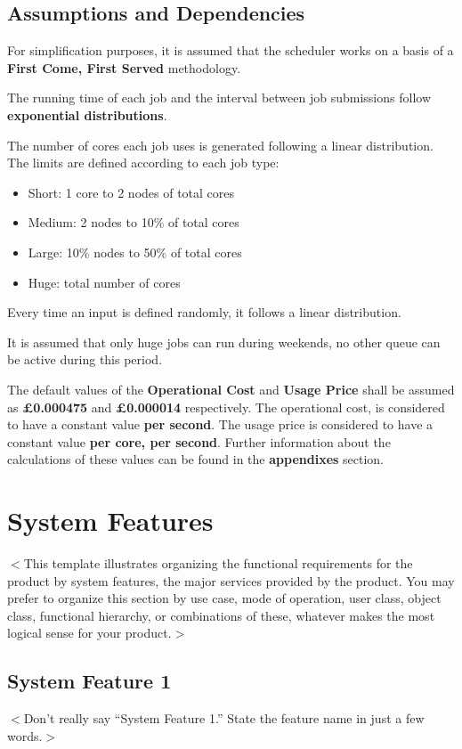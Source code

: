 \documentclass{scrreprt}
\begin{document}
\section{Assumptions and Dependencies}

\par For simplification purposes, it is assumed that the scheduler works on a basis of a \textbf{First Come, First Served} methodology. 
\par The running time of each job and the interval between job submissions follow \textbf{exponential distributions}.
\par The number of cores each job uses is generated following a linear distribution. The limits are defined according to each job type:
\begin{itemize}
\item Short: 1 core to 2 nodes of total cores
\item Medium: 2 nodes to 10\% of total cores
\item Large: 10\% nodes to 50\% of total cores
\item Huge: total number of cores
\end{itemize}
\par Every time an input is defined randomly, it follows a linear distribution.
\par It is assumed that only huge jobs can run during weekends, no other queue can be active during this period.
\par The default values of the \textbf{Operational Cost} and \textbf{Usage Price} shall be assumed as \textbf{£0.000475} and \textbf{£0.000014} respectively. The operational cost, is considered to have a constant value \textbf{per second}. The usage price is considered to have a constant value \textbf{per core, per second}. Further information about the calculations of these values can be found in the \textbf{appendixes} section.


\chapter{System Features}
$<$This template illustrates organizing the functional requirements for the 
product by system features, the major services provided by the product. You may 
prefer to organize this section by use case, mode of operation, user class, 
object class, functional hierarchy, or combinations of these, whatever makes the 
most logical sense for your product.$>$

\section{System Feature 1}
$<$Don’t really say “System Feature 1.” State the feature name in just a few 
words.$>$
\end{document}
